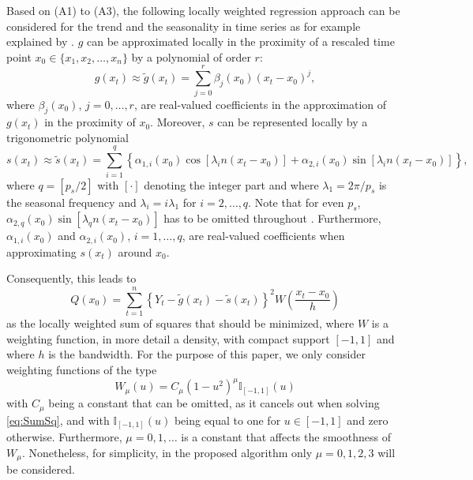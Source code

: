 Based on (A1) to (A3), the following locally weighted regression approach can be considered for the trend and the seasonality in time series as for example explained by \citet{heiler2000datadriven}. \(g\) can be approximated locally in the proximity of a rescaled time point \(x_0\in\{x_1,x_2,\dots,x_n\}\) by a polynomial of order \(r\):
\begin{equation}
g(x_t) \approx \tilde{g}(x_t) = \sum_{j=0}^{r}\beta_j(x_0)(x_t - x_0)^{j},
\label{eq:trend}
\end{equation}
where \(\beta_j(x_0)\), \(j=0,\dots, r\), are real-valued coefficients in the approximation of \(g(x_t)\) in the proximity of \(x_0\). Moreover, \(s\) can be represented locally by a trigonometric polynomial
\begin{equation}
s(x_t) \approx \tilde{s}(x_t) = \sum_{i=1}^{q}\left\{ \alpha_{1,i}(x_0)\cos \left[\lambda_i n(x_t-x_0)\right] + \alpha_{2,i}(x_0)\sin\left[\lambda_i n(x_t-x_0)\right] \right\},
\label{eq:season}
\end{equation}
where \(q=[p_s/2]\) with \([\cdot]\) denoting the integer part and where \(\lambda_1=2\pi/p_s\) is the seasonal frequency and \(\lambda_i=i\lambda_1\) for \(i=2,\dots,q\). Note that for even \(p_s\), \(\alpha_{2,q}(x_0)\sin\left[\lambda_q n(x_t-x_0)\right]\) has to be omitted throughout \citep{feng2013seasonal}. Furthermore, \(\alpha_{1,i}(x_0)\) and \(\alpha_{2,i}(x_0)\), \(i=1,\dots, q\), are real-valued coefficients when approximating \(s(x_t)\) around \(x_0\).

Consequently, this leads to
\begin{equation}
Q(x_0) = \sum_{t=1}^{n}\left\{Y_t - \tilde{g}(x_t) - \tilde{s}(x_t) \right\}^2 W\left(\frac{x_t-x_0}{h}\right)
\label{eq:SumSq}
\end{equation}
as the locally weighted sum of squares that should be minimized, where \(W\) is a weighting function, in more detail a density, with compact support \([-1,1]\) and where \(h\) is the bandwidth. For the purpose of this paper, we only consider weighting functions of the type
\begin{equation}
W_{\mu}(u) = C_\mu \left( 1 - u^2 \right)^\mu \mathbb{I}_{[-1,1]}(u)
\label{eq:secondKernel}
\end{equation}
with \(C_\mu\) being a constant that can be omitted, as it cancels out when solving \eqref{eq:SumSq}, and with \(\mathbb{I}_{[-1,1]}(u)\) being equal to one for \(u \in [-1,1]\) and zero otherwise. Furthermore, \(\mu=0,1,\dots\) is a constant that affects the smoothness of \(W_\mu\). Nonetheless, for simplicity, in the proposed algorithm only \(\mu=0,1,2,3\) will be considered.

